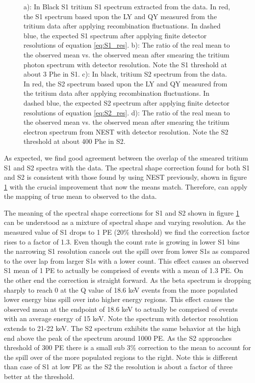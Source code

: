 \begin{figure}[h!]
\caption{a): In Black S1 tritium S1 spectrum extracted from the data. In red, the S1 spectrum based upon the LY and QY measured from the tritium data after applying recombination fluctuations. In dashed blue, the expected S1 spectrum after applying finite detector resolutions of equation \ref{eq:S1_res}.  b): The ratio of the real mean to the observed mean vs. the observed mean after smearing the tritium photon spectrum with detector resolution. Note the S1 threshold at about 3 Phe in S1. c): In black, tritium S2 spectrum from the data. In red, the S2 spectrum based upon the LY and QY measured from the tritium data after applying recombination fluctuations. In dashed blue, the expected S2 spectrum after applying finite detector resolutions of equation \ref{eq:S2_res}. d): The ratio of the real mean to the observed mean vs. the observed mean after smearing the tritium electron spectrum from NEST with detector resolution. Note the S2 threshold at about 400 Phe in S2.   }
\label{fig:S1S2_mapping_2}
\end{figure}
\renewcommand{\baselinestretch}{2}
\small\normalsize


As expected, we find good agreement between the overlap of the smeared tritium S1 and S2 spectra with the data. The spectral shape correction found for both S1 and S2 is consistent with those found by using NEST previously, shown in figure \ref{fig:S1S2_mapping_2} with the crucial improvement that now the means match. Therefore, can apply the mapping of true mean to observed to the data. 

The meaning of the spectral shape corrections for S1 and S2 shown in figure \ref{fig:S1S2_mapping_2} can be understood as a mixture of spectral shape and varying resolution. As the measured value of S1 drops to 1 PE (20\% threshold) we find the correction factor rises to a factor of 1.3. Even though the count rate is growing in lower S1 bins the narrowing S1 resolution cancels out the spill over from lower S1s as compared to the over lap from larger S1s with a lower count. This effect causes an observed S1 mean of 1 PE to actually be comprised of events with a mean of 1.3 PE. On the other end the correction is straight forward. As the beta spectrum is dropping sharply to reach 0 at the Q value of 18.6 keV \cite{Tritium_Q} events from the more populated lower energy bins spill over into higher energy regions. This effect causes the observed mean at the endpoint of 18.6 keV to actually be comprised of events with an average energy of 15 keV. Note the spectrum with detector resolution extends to 21-22 keV. The S2 spectrum exhibits the same behavior at the high end above the peak of the spectrum around 1000 PE. As the S2 approaches threshold of 300 PE there is a small sub 3\% correction to the mean to account for the spill over of the more populated regions to the right. Note this is different than case of S1 at low PE as the S2 the resolution is about a factor of three better at the threshold.


